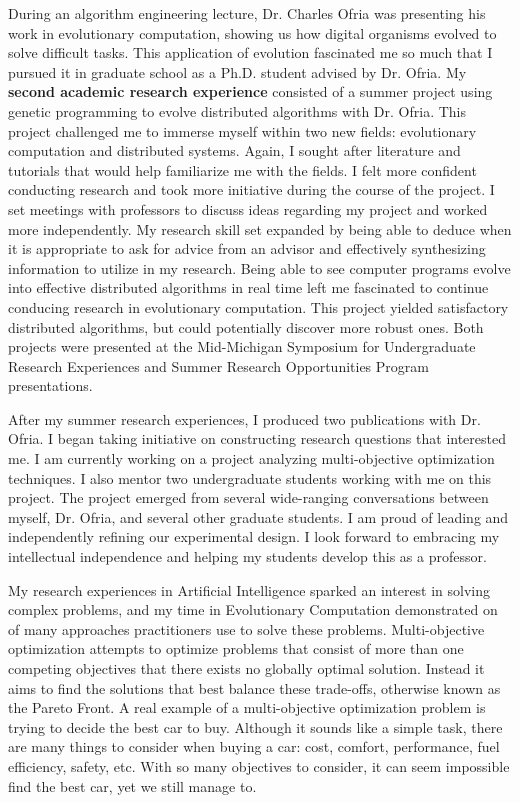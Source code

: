 \documentclass[12pt]{report}
\begin{document}
During an algorithm engineering lecture, Dr. Charles Ofria was presenting his work in evolutionary computation, showing us how digital organisms evolved to solve difficult tasks. 
This application of evolution fascinated me so much that I pursued it in graduate school as a Ph.D. student advised by Dr. Ofria.
My \textbf{second academic research experience} consisted of a summer project using genetic programming to evolve distributed algorithms with Dr. Ofria.
This project challenged me to immerse myself within two new fields: evolutionary computation and distributed systems.
Again, I sought after literature and tutorials that would help familiarize me with the fields.
I felt more confident conducting research and took more initiative during the course of the project. 
I set meetings with professors to discuss ideas regarding my project and worked more independently.
My research skill set expanded by being able to deduce when it is appropriate to ask for advice from an advisor and effectively synthesizing information to utilize in my research.
Being able to see computer programs evolve into effective distributed algorithms in real time left me fascinated to continue conducing research in evolutionary computation.
This project yielded satisfactory distributed algorithms, but could potentially discover more robust ones. 
Both projects were presented at the Mid-Michigan Symposium for Undergraduate Research Experiences and Summer Research Opportunities Program presentations. 

After my summer research experiences, I produced two publications with Dr. Ofria. 
I began taking initiative on constructing research questions that interested me. 
I am currently working on a project analyzing multi-objective optimization techniques. 
I also mentor two undergraduate students working with me on this project. 
The project emerged from several wide-ranging conversations between myself, Dr. Ofria, and several other graduate students.
I am proud of leading and independently refining our experimental design. 
I look forward to embracing my intellectual independence and helping my students develop this as a professor. 

My research experiences in Artificial Intelligence sparked an interest in solving complex problems, and my time in Evolutionary Computation demonstrated on of many approaches practitioners use to solve these problems. 
Multi-objective optimization attempts to optimize problems that consist of more than one competing objectives that there exists no globally optimal solution.
Instead it aims to find the solutions that best balance these trade-offs, otherwise known as the Pareto Front.
A real example of a multi-objective optimization problem is trying to decide the best car to buy.
Although it sounds like a simple task, there are many things to consider when buying a car: cost, comfort, performance, fuel efficiency, safety, etc. 
With so many objectives to consider, it can seem impossible find the best car, yet we still manage to.
\end{document}
